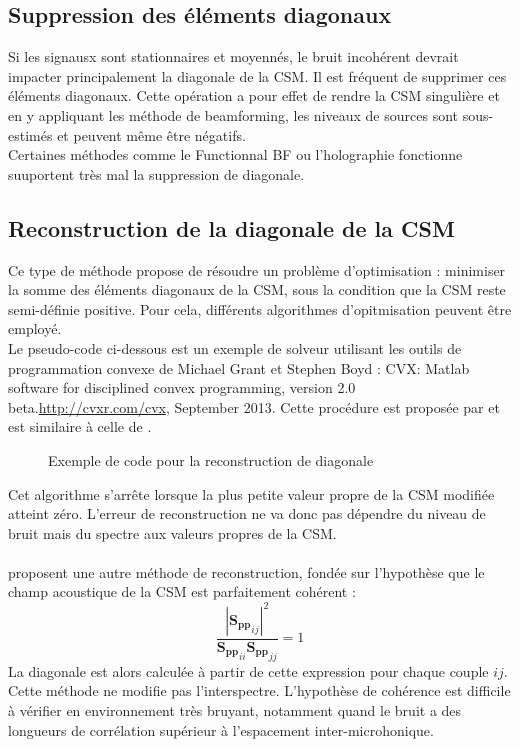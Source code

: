 \subsection{Suppression des éléments diagonaux}
Si les signausx sont stationnaires et moyennés, le bruit incohérent devrait impacter principalement la diagonale de la CSM. Il est fréquent de supprimer ces éléments diagonaux. Cette opération a pour effet de rendre la CSM singulière et en y appliquant les méthode de beamforming, les niveaux de sources sont sous-estimés et peuvent même être négatifs.\\
Certaines méthodes comme le Functionnal BF  ou l'holographie fonctionne suuportent très mal la suppression de diagonale.

\subsection{Reconstruction de la diagonale de la CSM}
Ce type de méthode propose de résoudre un problème d'optimisation : minimiser la somme des éléments diagonaux de la CSM, sous la condition que la CSM reste semi-définie positive. Pour cela, différents algorithmes d'opitmisation peuvent être employé.\\
Le pseudo-code ci-dessous est un exemple de solveur utilisant les outils de programmation convexe de Michael Grant et Stephen Boyd : CVX: Matlab software for disciplined convex programming, version 2.0 beta.\url{http://cvxr.com/cvx}, September 2013. Cette procédure est proposée par \cite{Hald2016} et est similaire à celle de \cite{dougherty2016}.

\begin{figure}[!h]
	\centering
	\caption{Exemple de code pour la reconstruction de diagonale}
\end{figure}
Cet algorithme s'arrête lorsque la plus petite valeur propre de la CSM modifiée atteint zéro. L'erreur de reconstruction ne va donc pas dépendre du niveau de bruit mais du spectre aux valeurs propres de la CSM. \\
~\\
\cite{finez:hal-01276687} proposent une autre méthode de reconstruction, fondée sur l'hypothèse que le champ acoustique de la CSM est parfaitement cohérent : 
\begin{equation}
\frac{|{\bm{S_{pp}}}_{ij}|^2}{{\bm{S_{pp}}}_{ii}{\bm{S_{pp}}}_{jj}} =1
\end{equation}
La diagonale est alors calculée à partir de cette expression pour chaque couple $ij$. Cette méthode ne modifie pas l'interspectre. L'hypothèse de cohérence est difficile à vérifier en environnement très bruyant, notamment quand le bruit a des longueurs de corrélation supérieur à l'espacement inter-microhonique.\\



